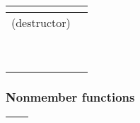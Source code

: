 \documentclass[letterpaper,10pt,english]{sphinxmanual}
\begin{document}
\begin{savenotes}\sphinxattablestart
\centering
\begin{tabulary}{\linewidth}[t]{|T|T|}
\hline

{\hyperref[\detokenize{programming-interface/runtime/device:constructor}]{}}
&\\
\hline
(destructor)
&\\
\hline
{\hyperref[\detokenize{programming-interface/runtime/device:get}]{}}
&\\
\hline
{\hyperref[\detokenize{programming-interface/runtime/device:is-host}]{}}
&\\
\hline
{\hyperref[\detokenize{programming-interface/runtime/device:is-cpu}]{}}
&\\
\hline
{\hyperref[\detokenize{programming-interface/runtime/device:is-gpu}]{}}
&\\
\hline
{\hyperref[\detokenize{programming-interface/runtime/device:is-accelerator}]{}}
&\\
\hline
{\hyperref[\detokenize{programming-interface/runtime/device:get-platform}]{}}
&\\
\hline
{\hyperref[\detokenize{programming-interface/runtime/device:get-info}]{}}
&\\
\hline
{\hyperref[\detokenize{programming-interface/runtime/device:has-extension}]{}}
&\\
\hline
{\hyperref[\detokenize{programming-interface/runtime/device:create-sub-devices}]{}}
&\\
\hline
\end{tabulary}
\par
\sphinxattableend\end{savenotes}
\subsubsection*{Nonmember functions}


\begin{savenotes}\sphinxattablestart
\centering
\begin{tabulary}{\linewidth}[t]{|T|T|}
\hline

{\hyperref[\detokenize{programming-interface/runtime/device:get-devices}]{}}
&\\
\hline
\end{tabulary}
\par
\sphinxattableend\end{savenotes}
\end{document}

